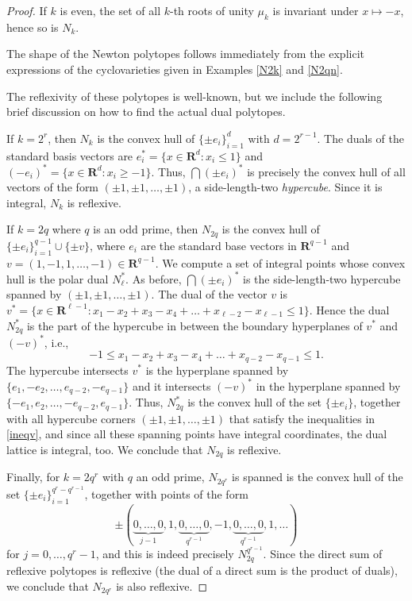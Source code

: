 \documentclass[12pt,reqno]{amsart}
\theoremstyle{definition}
\theoremstyle{plain}
\theoremstyle{definition}
\newcommand{\R}{\mathbf{R}}
\renewcommand{\geq}{\geqslant}
\renewcommand{\leq}{\leqslant}
\begin{document}
\begin{proof} If $k$ is even, the set of all $k$-th roots of unity $\mu_k$ is invariant under $x \mapsto -x$, hence so is $N_k$. 

The shape of the Newton polytopes follows immediately from the explicit expressions of the cyclovarieties given in Examples \ref{N2k} and \ref{N2qn}. 

The reflexivity of these polytopes is well-known, but we include the following brief discussion on how to find the actual dual polytopes. 

If $k=2^r$, then $N_k$ is the convex hull of $\{\pm e_i\}_ {i=1}^{d}$ with $d=2^{r-1}$.  The duals of the standard basis vectors are $e_i^* = \{ x \in \R^{d} \colon x_i \leq 1\}$ and $(-e_i)^* = \{ x \in \R^{d} \colon x_i \geq -1\}$. Thus, $\bigcap (\pm e_i)^*$ is precisely the convex hull of all vectors of the form $(\pm 1, \pm 1, \dots, \pm 1)$, a side-length-two \emph{hypercube}. Since it is integral, $N_k$ is reflexive.  

If $k=2q$ where $q$ is an odd prime, then $N_{2q}$ is the convex hull of $\{\pm e_i\}_ {i=1}^{q-1} \cup \{\pm v\}$, where $e_i$ are the standard base vectors in $\R^{q-1}$ and $v=(1,-1,1,\dots,-1) \in \R^{q-1}$. We compute a set of integral points whose convex hull is the polar dual $N_\ell^*$. As before, $\bigcap (\pm e_i)^*$ is the side-length-two hypercube spanned by $(\pm 1, \pm 1, \dots, \pm 1)$. The dual of the vector $v$ is $v^*=\{ x \in \R^{\ell-1} \colon x_1-x_2+x_3-x_4+\dots + x_{\ell-2} - x_{\ell-1} \leq 1\}$. Hence the dual $N^*_{2q}$ is the part of the hypercube in between the boundary hyperplanes of $v^*$ and $(-v)^*$, i.e., \begin{equation} \label{ineqv}  -1 \leq x_1-x_2+x_3-x_4+\dots + x_{q-2} - x_{q-1} \leq 1. \end{equation} 
The hypercube intersects $v^*$ is the hyperplane spanned by $\{e_1,-e_2,\dots,e_{q-2}, -e_{q-1}\}$ and it intersects $(-v)^*$ in the hyperplane spanned by $\{-e_1,e_2,\dots,-e_{q-2},e_{q-1}\}.$
Thus, $N^*_{2q}$ is the convex hull of the set $\{\pm e_i\}$, together with all hypercube corners $(\pm 1, \pm 1, \dots, \pm 1)$ that satisfy the inequalities in \eqref{ineqv}, and since all these spanning points have integral coordinates, the dual lattice is integral, too. We conclude that $N_{2q}$ is reflexive. 

Finally, for $k=2q^r$ with $q$ an odd prime, $N_{2q^r}$ is spanned is the convex hull of the set $\{\pm e_i\}_{i=1}^{q^r-q^{r-1}}$, together with points of the form 
 $$ \pm (\underbrace{0, \dots, 0}_{j-1},1, \underbrace{0, \dots, 0}_{q^{r-1}}, -1, \underbrace{0, \dots, 0}_{q^{r-1}}, 1,\dots)$$
 for $j=0,\dots,q^r-1$, and this is indeed precisely $N_{2q}^{q^{r-1}}$. Since the direct sum of reflexive polytopes is reflexive (the dual of a direct sum is the product of duals), we conclude that $N_{2q^r}$ is also reflexive. 
 \end{proof} 
 
\end{document}
